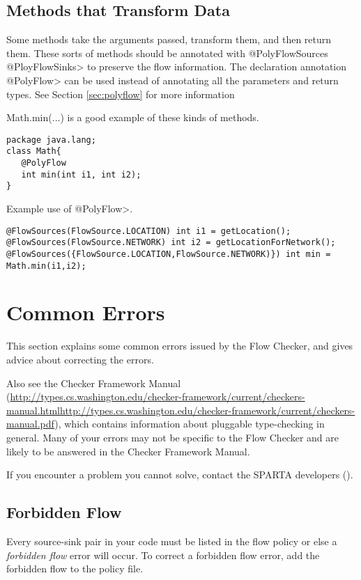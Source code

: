 \subsection{Methods that Transform Data}

Some methods take the arguments passed, transform them, and then return them.  These sorts of 
methods should be annotated with \<@PolyFlowSources @PloyFlowSinks>
  to preserve the flow information.  The declaration annotation \<@PolyFlow> can be used instead of
  annotating all the parameters and return types. See Section \ref{sec:polyflow} for more information 
  
  Math.min(...) is a good example of these kinds of methods. 
  
  \begin{Verbatim}
package java.lang;
class Math{
   @PolyFlow  
   int min(int i1, int i2);
}
\end{Verbatim}

Example use of \<@PolyFlow>.
\begin{Verbatim}
@FlowSources(FlowSource.LOCATION) int i1 = getLocation();
@FlowSources(FlowSource.NETWORK) int i2 = getLocationForNetwork();
@FlowSources({FlowSource.LOCATION,FlowSource.NETWORK)}) int min = Math.min(i1,i2);
 \end{Verbatim}

\section{Common Errors\label{errors}}

This section explains some common errors issued by the Flow Checker, and
gives advice about correcting the errors.   

Also see the Checker Framework Manual
(\ifhevea\url{http://types.cs.washington.edu/checker-framework/current/checkers-manual.html}\else\url{http://types.cs.washington.edu/checker-framework/current/checkers-manual.pdf}\fi),
which contains information about pluggable type-checking in general.  Many
of your errors may not be specific to the Flow Checker and are likely to be
answered in the Checker Framework Manual.

If you encounter a problem you cannot solve, contact the SPARTA developers ().



\subsection{Forbidden Flow}  
Every source-sink pair in your code must be listed in the flow policy or else a \emph{forbidden flow} error will occur.
To correct a forbidden flow error, add the forbidden flow to the policy file. 
  
